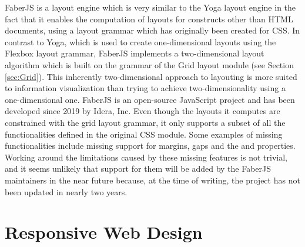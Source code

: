 FaberJS \parencite{FaberJS} is a layout engine which is very similar to the Yoga layout engine in the fact that it enables the computation of layouts for constructs other than HTML documents, using a layout grammar which has originally been created for CSS. 
In contrast to Yoga, which is used to create one-dimensional layouts using the Flexbox layout grammar, FaberJS implements a two-dimensional layout algorithm which is built on the grammar of the Grid layout module (see Section \ref{sec:Grid}). 
This inherently two-dimensional approach to layouting is more suited to information visualization than trying to achieve two-dimensionality using a one-dimensional one. 
FaberJS is an open-source JavaScript project and has been developed since 2019 by Idera, Inc.
Even though the layouts it computes are constrained with the grid layout grammar, it only supports a subset of all the functionalities defined in the original CSS module. 
Some examples of missing functionalities include missing support for margins, gaps and the  and  properties. 
Working around the limitations caused by these missing features is not trivial, and it seems unlikely that support for them will be added by the FaberJS maintainers in the near future because, at the time of writing, the project has not been updated in nearly two years. 

\section{Responsive Web Design}
\label{sec:RWD}

